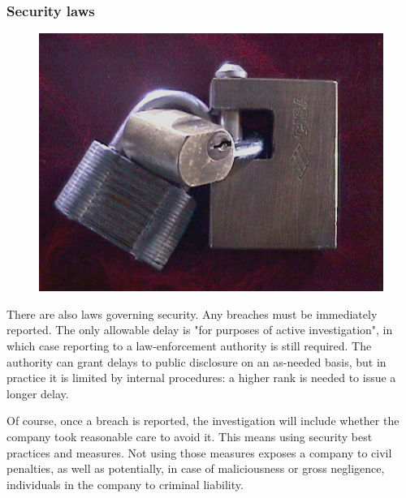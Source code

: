 \begin{frame}[fragile]
\frametitle{Security laws}


\begin{figure}
\includegraphics{security}
\end{figure}

\end{frame}

There are also laws governing security.
Any breaches must be immediately reported.
The only allowable delay is
"for purposes of active investigation",
in which case reporting to a law-enforcement authority is still required.
The authority can grant delays to public disclosure on an
as-needed
basis,
but in practice it is limited by internal procedures:
a higher rank is needed to issue a longer delay.

Of course,
once a breach is reported,
the investigation will include whether the company took reasonable care to
avoid it.
This means using security best practices and measures.
Not using those measures exposes a company to civil penalties,
as well as potentially,
in case of maliciousness or gross negligence,
individuals in the company to criminal liability.

